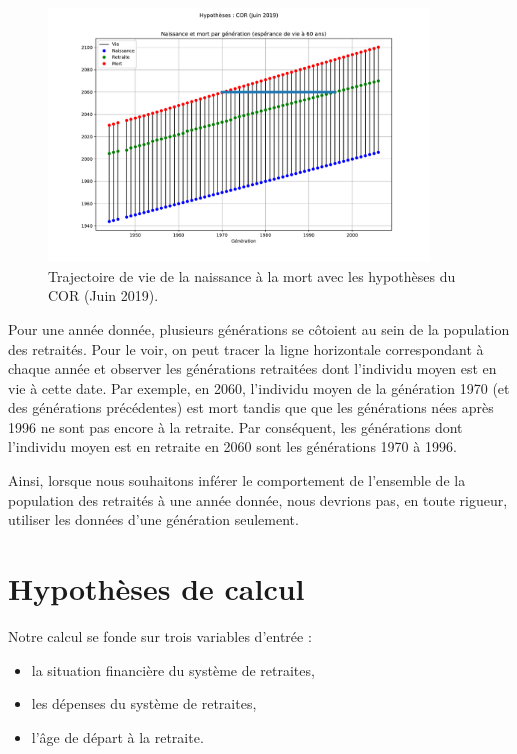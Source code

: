 \documentclass[10pt]{article}
\begin{document}
\begin{figure}
\begin{center}
\includegraphics[width=0.9\textwidth]{Simulation-generation-vs-annee.pdf}
\end{center}
\caption{Trajectoire de vie de la naissance à la mort avec 
les hypothèses du COR (Juin 2019).}
\label{fig-trajectoire-vie}
\end{figure}

Pour une année donnée, plusieurs générations se côtoient au sein de la population des retraités. 
Pour le voir, on peut tracer la ligne horizontale correspondant à chaque année et observer les générations retraitées dont l'individu moyen est en vie à cette date. 
Par exemple, en 2060, l'individu moyen de la génération 1970 (et des générations précédentes) est mort tandis que que les générations nées après 1996 ne sont pas encore à la retraite. 
Par conséquent, les générations dont l'individu moyen est en retraite en 2060 sont les générations 1970 à 1996. 

Ainsi, lorsque nous souhaitons inférer le comportement de l'ensemble de la 
population des retraités à une année donnée, nous devrions pas, en toute 
rigueur, utiliser les données d'une génération seulement. 


\section{Hypothèses de calcul}

Notre calcul se fonde sur trois variables d'entrée :
\begin{itemize}
\item la situation financière du système de retraites, 
\item les dépenses du système de retraites, 
\item l'âge de départ à la retraite. 
\end{itemize}
\end{document}
